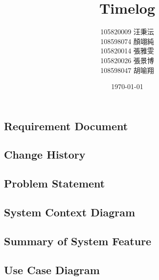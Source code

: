 \documentclass[12pt, a4paper]{article}
\title{Timelog}
\author{105820009 汪秉沄\\
108598074 顏翊純\\
105820014 張雅雯\\
105820026 張景博\\
108598047 胡喻翔}
\date{\today}
\begin{document}
\begin{CJK*}{UTF8}{bkai}
\maketitle
\newpage

\tableofcontents
\newpage


\section{Requirement Document}
  \subsection{Change History}

  \subsection{Problem Statement}

  \subsection{System Context Diagram}

  \subsection{Summary of System Feature}

  \subsection{Use Case Diagram}


\end{CJK*}
\end{document}
